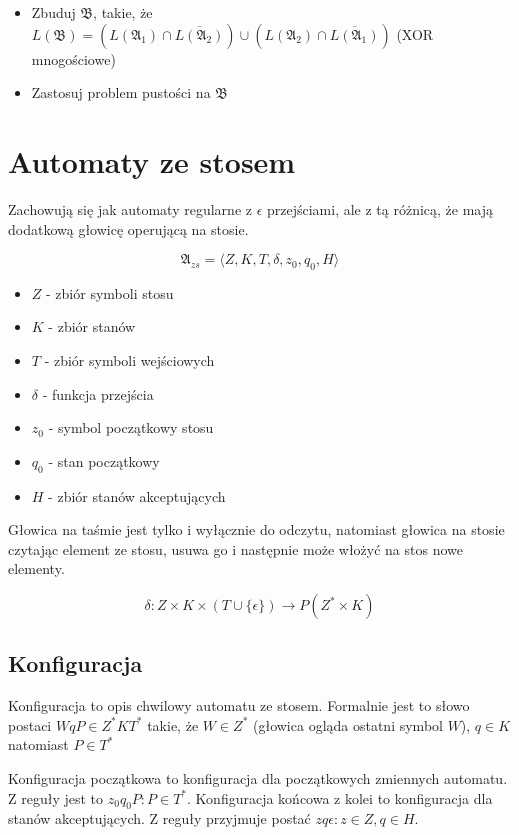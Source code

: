 \documentclass{../notatki}
\begin{document}
\begin{itemize}
  \item Zbuduj $\mathfrak{B}$, takie, że $L(\mathfrak{B}) =
    (L(\mathfrak{A_1}) \cap \overline{L(\mathfrak{A_2})}) \cup
    (L(\mathfrak{A_2}) \cap \overline{L(\mathfrak{A_1})})$ (XOR mnogościowe)
  \item Zastosuj problem pustości na $\mathfrak{B}$
\end{itemize}

\section{Automaty ze stosem}

Zachowują się jak automaty regularne z $\epsilon$ przejściami, ale z tą różnicą,
że mają dodatkową głowicę operującą na stosie.

$$
\mathfrak{A}_{zs} = \langle Z, K, T, \delta, z_0, q_0, H \rangle
$$

\begin{itemize}
  \item $Z$ - zbiór symboli stosu
  \item $K$ - zbiór stanów
  \item $T$ - zbiór symboli wejściowych
  \item $\delta$ - funkcja przejścia
  \item $z_0$ - symbol początkowy stosu
  \item $q_0$ - stan początkowy
  \item $H$ - zbiór stanów akceptujących
\end{itemize}

Głowica na taśmie jest tylko i wyłącznie do odczytu, natomiast głowica na stosie
czytając element ze stosu, usuwa go i następnie może włożyć na stos nowe
elementy.

$$
\delta: Z \times K \times (T \cup \{\epsilon\}) \rightarrow P(Z^* \times K)
$$

\subsection{Konfiguracja}

Konfiguracja to opis chwilowy automatu ze stosem. Formalnie jest to słowo
postaci $WqP \in Z^*KT^*$ takie, że $W \in Z^*$ (głowica ogląda ostatni symbol
$W$), $q \in K$ natomiast $P \in T^*$

Konfiguracja początkowa to konfiguracja dla początkowych zmiennych automatu.
Z reguły jest to $z_0q_0P : P \in T^*$. Konfiguracja końcowa z kolei to
konfiguracja dla stanów akceptujących. Z reguły przyjmuje postać $z
q\epsilon : z \in Z, q \in H$.
\end{document}
